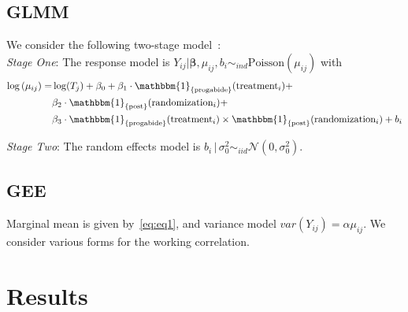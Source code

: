 \documentclass[11pt,letter]{article}\usepackage[]{graphicx}\usepackage[]{color}
\newcommand{\tm}[1]{\textrm{#1}}
\begin{document}
\subsection{GLMM}

We consider the following two-stage model~\citep{wakefield2013bayesian}:\\
\textit{Stage One}: The response model is $Y_{ij}|\boldsymbol{\beta},\mu_{ij},b_i \sim_{ind} \tm{Poisson}(\mu_{ij})$ with
\begin{align}
\log \left(\mu_{ij} \right)  = &\log(T_{j}) + \beta_0 + \beta_1 \cdot  \mathbbm{1}_{\left\lbrace \tm{progabide} \right\rbrace }(\mbox{treatment}_{i}) + \nonumber \\ 
& \beta_2 \cdot  \mathbbm{1}_{\left\lbrace \tm{post} \right\rbrace }(\mbox{randomization}_{i}) + \nonumber \\ 
& \beta_3 \cdot \mathbbm{1}_{\left\lbrace \tm{progabide} \right\rbrace }(\mbox{treatment}_{i})  \times \mathbbm{1}_{\left\lbrace \tm{post} \right\rbrace }(\mbox{randomization}_{i}) + b_i  \label{eq:eq2}
\end{align}

\textit{Stage Two}: The random effects model is $b_i\, |\, \sigma_0^2 \sim_{iid} \mathcal{N}(0,\sigma_0^2)$.

\subsection{GEE}
Marginal mean is given by~\eqref{eq:eq1}, and variance model $var(Y_{ij}) = \alpha \mu_{ij}$. We consider various forms for the working correlation.


\section{Results}
\end{document}
